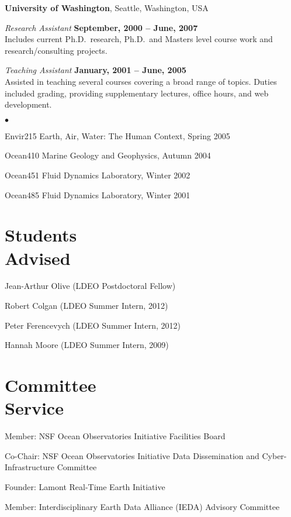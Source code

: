 \documentclass[11pt]{res}
\newenvironment{list2}{
  \begin{list}{$\bullet$}{%
      \setlength{\itemsep}{0in}
      \setlength{\parsep}{0in} \setlength{\parskip}{0in}
      \setlength{\topsep}{0in} \setlength{\partopsep}{0in} 
      \setlength{\leftmargin}{0.2in}}}{\end{list}}
\begin{document}
\begin{resume}
{\bf University of Washington}, Seattle, Washington, USA

{\em Research Assistant} \hfill {\bf September, 2000 -- June, 2007}\\
Includes current Ph.D.~research, Ph.D.~and Masters level course work and
research/consulting projects.

{\em Teaching Assistant} \hfill {\bf January, 2001 -- June, 2005}\\
Assisted in teaching several courses covering a broad range of topics. Duties included
grading, providing supplementary lectures, office hours, and web development.
\vspace*{0.05in}
\begin{list2}
\item Envir215 Earth, Air, Water: The Human Context, Spring 2005
\item Ocean410 Marine Geology and Geophysics, Autumn 2004
\item Ocean451 Fluid Dynamics Laboratory, Winter 2002
\item Ocean485 Fluid Dynamics Laboratory, Winter 2001
\end{list2}

\section{\sc Students\\Advised}
Jean-Arthur Olive (LDEO Postdoctoral Fellow)

Robert Colgan (LDEO Summer Intern, 2012)

Peter Ferencevych (LDEO Summer Intern, 2012)

Hannah Moore (LDEO Summer Intern, 2009)
\vspace{0.2in}

\section{\sc Committee\\Service}

Member: NSF Ocean Observatories Initiative Facilities Board

Co-Chair: NSF Ocean Observatories Initiative Data Dissemination and Cyber-Infrastructure Committee

Founder: Lamont Real-Time Earth Initiative

Member: Interdisciplinary Earth Data Alliance (IEDA) Advisory Committee


\end{resume}
\end{document}
